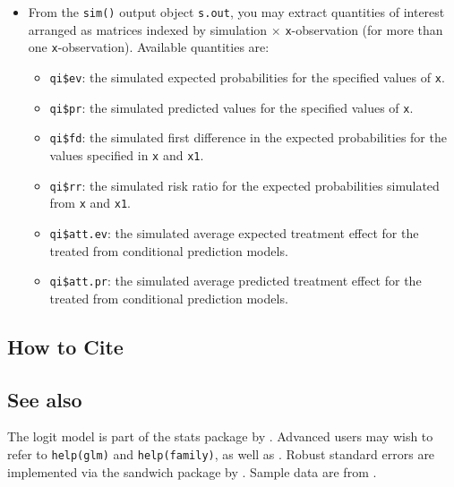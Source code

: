 \begin{itemize}
\item From the {\tt sim()} output object {\tt s.out}, you may extract
  quantities of interest arranged as matrices indexed by simulation
  $\times$ {\tt x}-observation (for more than one {\tt x}-observation).
  Available quantities are:

   \begin{itemize}
   \item {\tt qi\$ev}: the simulated expected probabilities for the
     specified values of {\tt x}.
   \item {\tt qi\$pr}: the simulated predicted values for the
     specified values of {\tt x}.
   \item {\tt qi\$fd}: the simulated first difference in the expected
     probabilities for the values specified in {\tt x} and {\tt x1}.
   \item {\tt qi\$rr}: the simulated risk ratio for the expected
     probabilities simulated from {\tt x} and {\tt x1}.
   \item {\tt qi\$att.ev}: the simulated average expected treatment
     effect for the treated from conditional prediction models.  
   \item {\tt qi\$att.pr}: the simulated average predicted treatment
     effect for the treated from conditional prediction models.  
   \end{itemize}
\end{itemize}

\subsection* {How to Cite} 





\subsection*{See also}

The logit model is part of the stats package by \citet{VenRip02}.
Advanced users may wish to refer to \texttt{help(glm)} and
\texttt{help(family)}, as well as \cite{McCNel89}. Robust standard
errors are implemented via the sandwich package by \citet{Zeileis04}.
Sample data are from \cite{KinTomWit00}.



 










